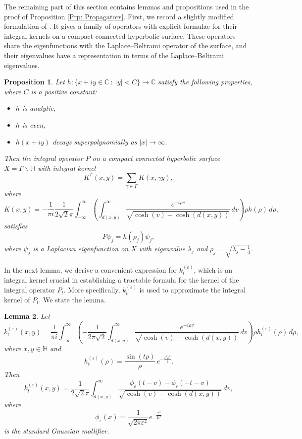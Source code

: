 \documentclass[11pt,twoside,reqno]{amsart} \usepackage{a4wide} \usepackage[T1]{fontenc} \usepackage[utf8]{inputenc} \usepackage{soul}  \usepackage{amsmath} \usepackage{amsfonts} \usepackage{amssymb} \usepackage{mathtools} \usepackage{amsthm} \usepackage{xcolor} \usepackage{graphicx} \usepackage{hyperref} \usepackage{standalone} \usepackage{esint} \usepackage{comment} \usepackage[left=2.3cm,top=3cm,right=2.3cm]{geometry} \usepackage{bm} \usepackage{svg} \usepackage{float} \numberwithin{equation}{section} \theoremstyle{plain} \newtheorem{thm}{Theorem}[section] \newtheorem{theorem}[thm]{Theorem} \newtheorem*{theorem*}{Theorem}\newtheorem{conj}[thm]{Conjecture} \newtheorem{lemma}[thm]{Lemma} \newtheorem{prop}[thm]{Proposition} \newtheorem{proposition}[thm]{Proposition} \newtheorem{cor}[thm]{Corollary} \newtheorem{question}[thm]{Question} \newtheorem{corollary}[thm]{Corollary} \newtheorem{assumption}[thm]{Assumption} \theoremstyle{definition} \newtheorem{defn}[thm]{Definition} \newtheorem{choice}[thm]{Choice} \newtheorem{definition}[thm]{Definition} \newtheorem{ex}[thm]{Example} \newtheorem{notation}[thm]{Notation} \newtheorem*{ack}{Acknowledgements} \theoremstyle{remark} \newtheorem{remark}[thm]{Remark} \newtheorem{bigremark}[thm]{Remark} \usepackage{xcolor} \newcommand{\red}[1]{ {\color{Red}#1} } \newcommand{\blue}[1]{ {\color{Blue}#1} } \author{Kai Hippi} \address{Aalto University, Espoo, Finland} \email{kai.hippi@aalto.fi}
\begin{document}
The remaining part of this section contains lemmas and propositions used in the proof of Proposition \ref{Prp: Propagators}. First, we record a slightly modified formulation of \cite[Prop. 5]{Mar12}. It gives a family of operators with explicit formulae for their integral kernels on a compact connected hyperbolic surface. These operators share the eigenfunctions with the Laplace–Beltrami operator of the surface, and their eigenvalues have a representation in terms of the Laplace–Beltrami eigenvalues.

\begin{proposition}
\label{Prp: Marklof}
Let $h: \{ x+iy \in \mathbb{C} \ : \ |y| < C \} \to \mathbb{C}$ satisfy the following properties, where $C$ is a positive constant:
\begin{itemize}
	\item $h$ is analytic,
	\item $h$ is even,
	\item $h(x+iy)$ decays superpolynomially as $|x| \to \infty$.
\end{itemize}
Then the integral operator $P$ on a compact connected hyperbolic surface $X = \Gamma \backslash \mathbb{H}$ with integral kernel
$$
K^\Gamma(x,y) = \sum_{\gamma \in \Gamma} K(x, \gamma y),
$$
where
$$
K(x,y) = - \frac{1}{\pi i} \frac{1}{2 \sqrt{2} \pi} \int_{-\infty}^\infty \left( \int_{d(x,y)}^\infty \frac{e^{-i \rho v}}{\sqrt{\cosh(v) - \cosh(d(x,y))}} \, dv \right) \rho h(\rho) \, d\rho,
$$
satisfies
\[
P \psi_j = h(\rho_j) \psi_j,
\]
where $\psi_j$ is a Laplacian eigenfunction on $X$ with eigenvalue $\lambda_j$ and $\rho_j = \sqrt{\lambda_j - \tfrac{1}{4}}$.
\end{proposition}

In the next lemma, we derive a convenient expression for $k_t^{(\varepsilon)}$, which is an integral kernel crucial in establishing a tractable formula for the kernel of the integral operator $P_{t}$. More specifically, $k_{t}^{(\varepsilon)}$ is used to approximate the integral kernel of $P_{t}$. We state the lemma.

\begin{lemma}
\label{Lmm: Understanding Green's}
Let
\[
k_t^{(\varepsilon)}(x,y) = \frac{1}{\pi i} \int_{-\infty}^{\infty} \left( -\frac{1}{2\pi \sqrt{2}} \int_{d(x,y)}^\infty \frac{e^{-i \rho v}}{\sqrt{\cosh(v) - \cosh(d(x,y))}} \, dv \right) \rho h_t^{(\varepsilon)}(\rho) \, d\rho,
\]
where $x,y \in \mathbb{H}$ and
$$h_t^{(\varepsilon)}(\rho) = \frac{\sin(t\rho)}{\rho} \, e^{-\frac{\varepsilon^2 \rho^2}{2}}.$$  
Then
\[
k_t^{(\varepsilon)}(x,y) = \frac{1}{2\sqrt{2} \pi} \int_{d(x,y)}^\infty \frac{\phi_\varepsilon(t-v) - \phi_\varepsilon(-t-v)}{\sqrt{\cosh(v) - \cosh(d(x,y))}} \, dv,
\]
where 
$$\phi_\varepsilon(x) = \frac{1}{\sqrt{2\pi \varepsilon^{2}}} e^{-\frac{x^2}{2\varepsilon^2}}$$
is the standard Gaussian mollifier.
\end{lemma}
\end{document}
